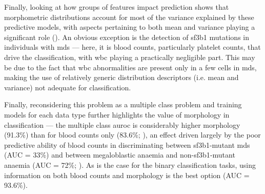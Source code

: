 Finally, looking at how groups of features impact prediction shows that morphometric distributions account for most of the variance explained by these predictive models, with aspects pertaining to both mean and variance playing a significant role (). An obvious exception is the detection of \ac{sf3b1} mutations in individuals with \ac{mds} --- here, it is blood counts, particularly platelet counts, that drive the classification, with \ac{wbc} playing a practically negligible part. This may be due to the fact that \ac{wbc} abnormalities are present only in a few cells in \ac{mds}, making the use of relatively generic distribution descriptors (i.e. mean and variance) not adequate for classification.

\begin{figure}[!ht]
    \label{fig:feature-group-importance}
\end{figure}

Finally, reconsidering this problem as a multiple class problem and training models for each data type further highlights the value of morphology in classification --- the multiple class \ac{auroc} is considerably higher morphology (91.3\%) than for blood counts only (83.6\%; ), an effect driven largely by the poor predictive ability of blood counts in discriminating between \ac{sf3b1}-mutant \ac{mds} (AUC = 33\%) and between megaloblastic anaemia and non-\ac{sf3b1}-mutant anaemia (AUC = 72\%; ). As is the case for the binary classification tasks, using information on both blood counts and morphology is the best option (AUC = 93.6\%).

\begin{figure}[!ht]
    \label{fig:multiclass-auc}
\end{figure}

\begin{figure}[!ht]
    \label{fig:multiclass-auc-heatmap}
\end{figure}

